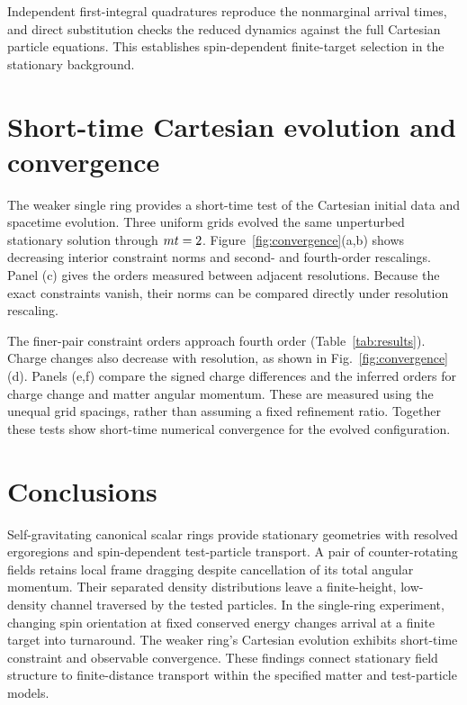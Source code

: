 \documentclass[10pt,twocolumn,floatfix,aps,prd,superscriptaddress,nofootinbib]{revtex4-2}
\begin{document}
Independent first-integral quadratures reproduce the nonmarginal arrival
times, and direct substitution checks the reduced dynamics against the full
Cartesian particle equations. This establishes spin-dependent finite-target
selection in the stationary background.





\section{Short-time Cartesian evolution and convergence}
\label{sec:evolution}

The weaker single ring provides a short-time test of the Cartesian initial
data and spacetime evolution. Three uniform grids evolved the same
unperturbed stationary solution through $mt=2$.
Figure~\ref{fig:convergence}(a,b) shows decreasing interior constraint norms
and second- and fourth-order rescalings. Panel (c) gives the orders measured
between adjacent resolutions. Because the exact constraints vanish, their
norms can be compared directly under resolution rescaling.

The finer-pair constraint orders approach fourth order
(Table~\ref{tab:results}). Charge changes also decrease with resolution,
as shown in Fig.~\ref{fig:convergence}(d). Panels (e,f) compare the signed
charge differences and the inferred orders for charge change and matter
angular momentum. These are measured using the unequal grid spacings,
rather than assuming a fixed refinement ratio. Together these tests show
short-time numerical convergence for the evolved configuration.



\section{Conclusions}
\label{sec:conclusion}

Self-gravitating canonical scalar rings provide stationary geometries with
resolved ergoregions and spin-dependent test-particle transport. A pair of
counter-rotating fields retains local frame dragging despite cancellation of
its total angular momentum. Their separated density distributions leave a
finite-height, low-density channel traversed by the tested particles.
In the single-ring experiment, changing spin orientation at fixed conserved
energy changes arrival at a finite target into turnaround. The weaker ring's
Cartesian evolution exhibits short-time constraint and observable convergence.
These findings connect stationary field structure to finite-distance transport
within the specified matter and test-particle models.
\end{document}
